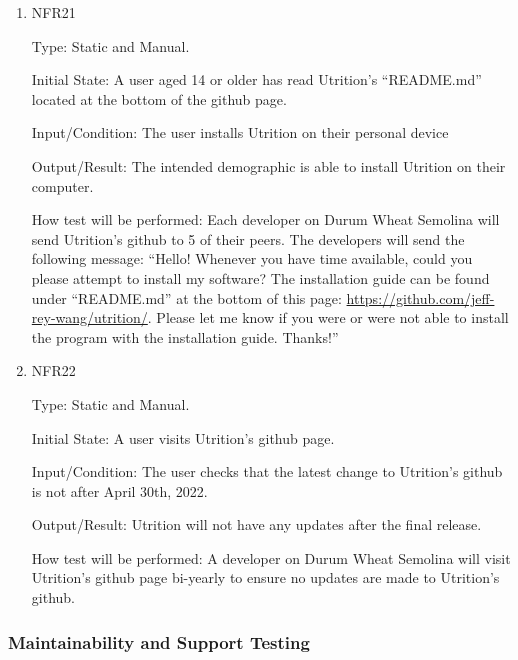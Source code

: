 \documentclass[12pt, titlepage]{article}
\begin{document}
	\begin{enumerate}
		
		\item{NFR21\\} 
		
		Type: Static and Manual.
		
		Initial State: A user aged 14 or older has read Utrition’s “README.md” located at the bottom of the github page.
		
		Input/Condition: The user installs Utrition on their personal device
		
		Output/Result: The intended demographic is able to install Utrition on their computer.
		
		How test will be performed: Each developer on Durum Wheat Semolina will send Utrition’s github to 5 of their peers. The developers will send the following message: “Hello! Whenever you have time available, could you please attempt to install my software? The installation guide can be found under “README.md” at the bottom of this page: \href{https://github.com/jeff-rey-wang/utrition/}{https://github.com/jeff-rey-wang/utrition/}. Please let me know if you were or were not able to install the program with the installation guide. Thanks!”
		
		\item{NFR22\\} 
		
		Type: Static and Manual.
		
		Initial State: A user visits Utrition’s github page.
		
		Input/Condition: The user checks that the latest change to Utrition’s github is not after April 30th, 2022.
		
		Output/Result: Utrition will not have any updates after the final release.
		
		How test will be performed: A developer on Durum Wheat Semolina will visit Utrition’s github page bi-yearly to ensure no updates are made to Utrition’s github.
		
	\end{enumerate}
	
	\subsubsection{Maintainability and Support Testing}
	
	
\end{document}
